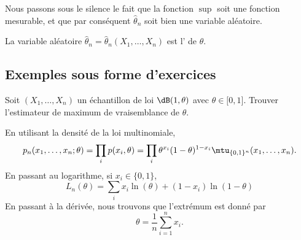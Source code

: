 \begin{remark}
	Nous passons sous le silence le fait que la fonction \( \sup\) soit une fonction mesurable, et que par conséquent \( \hat\theta_n\) soit bien une variable aléatoire.
\end{remark}

La variable aléatoire \( \hat\theta_n=\hat\theta_n(X_1,\ldots,X_n)\) est l' de \( \theta\).

\subsection{Exemples sous forme d'exercices}

\begin{example}
	Soit \( (X_1,\ldots,X_n)\) un échantillon de loi \( \dB(1,\theta)\) avec \( \theta\in\mathopen[ 0 , 1 \mathclose]\). Trouver l'estimateur de maximum de vraisemblance de \( \theta\).

	En utilisant la densité de la loi multinomiale,
	\begin{equation}
		p_n(x_1,\ldots,x_n;\theta)=\prod_ip(x_i,\theta)=\prod_i\theta^{x_i}(1-\theta)^{1-x_i}\mtu_{\{ 0,1 \}^n}(x_1,\ldots,x_n).
	\end{equation}
	En passant au logarithme, si \( x_i\in\{ 0,1 \}\),
	\begin{equation}
		L_n(\theta)=\sum_i x_i\ln(\theta)+(1-x_i)\ln(1-\theta)
	\end{equation}
	En passant à la dérivée, nous trouvons que l'extrémum est donné par
	\begin{equation}
		\theta=\frac{1}{ n }\sum_{i=1}^nx_i.
	\end{equation}
\end{example}

